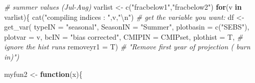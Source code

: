\documentclass[
]{article}
\newenvironment{Shaded}{\begin{snugshade}}{\end{snugshade}}
\newcommand{\AttributeTok}[1]{\textcolor[rgb]{0.77,0.63,0.00}{#1}}
\newcommand{\CommentTok}[1]{\textcolor[rgb]{0.56,0.35,0.01}{\textit{#1}}}
\newcommand{\ControlFlowTok}[1]{\textcolor[rgb]{0.13,0.29,0.53}{\textbf{#1}}}
\newcommand{\FunctionTok}[1]{\textcolor[rgb]{0.00,0.00,0.00}{#1}}
\newcommand{\NormalTok}[1]{#1}
\newcommand{\OtherTok}[1]{\textcolor[rgb]{0.56,0.35,0.01}{#1}}
\newcommand{\SpecialCharTok}[1]{\textcolor[rgb]{0.00,0.00,0.00}{#1}}
\newcommand{\StringTok}[1]{\textcolor[rgb]{0.31,0.60,0.02}{#1}}
\begin{document}
\begin{Shaded}
\begin{Highlighting}[]
    \CommentTok{\# summer values  (Jul{-}Aug)}
\NormalTok{    varlist }\OtherTok{\textless{}{-}} \FunctionTok{c}\NormalTok{(}\StringTok{"fracbelow1"}\NormalTok{,}\StringTok{"fracbelow2"}\NormalTok{)}
    \ControlFlowTok{for}\NormalTok{(v }\ControlFlowTok{in}\NormalTok{ varlist)\{}
         \FunctionTok{cat}\NormalTok{(}\StringTok{"compiling indices : "}\NormalTok{,v,}\StringTok{"}\SpecialCharTok{\textbackslash{}n}\StringTok{"}\NormalTok{)}
      \CommentTok{\# get the variable you want:}
\NormalTok{      df }\OtherTok{\textless{}{-}} \FunctionTok{get\_var}\NormalTok{( }\AttributeTok{typeIN    =} \StringTok{"seasonal"}\NormalTok{, }
                     \AttributeTok{SeasonIN =}  \StringTok{"Summer"}\NormalTok{,}
                     \AttributeTok{plotbasin  =} \FunctionTok{c}\NormalTok{(}\StringTok{"SEBS"}\NormalTok{),}
                     \AttributeTok{plotvar   =}\NormalTok{ v,}
                     \AttributeTok{bcIN      =} \StringTok{"bias corrected"}\NormalTok{,}
                     \AttributeTok{CMIPIN    =}\NormalTok{ CMIPset, }
                     \AttributeTok{plothist  =}\NormalTok{ T,  }\CommentTok{\# ignore the hist runs}
                     \AttributeTok{removeyr1 =}\NormalTok{ T)  }\CommentTok{\# "Remove first year of projection ( burn in)")}
        
\NormalTok{      myfun2 }\OtherTok{\textless{}{-}} \ControlFlowTok{function}\NormalTok{(x)\{}
        

\end{Highlighting}
\end{Shaded}
\end{document}
